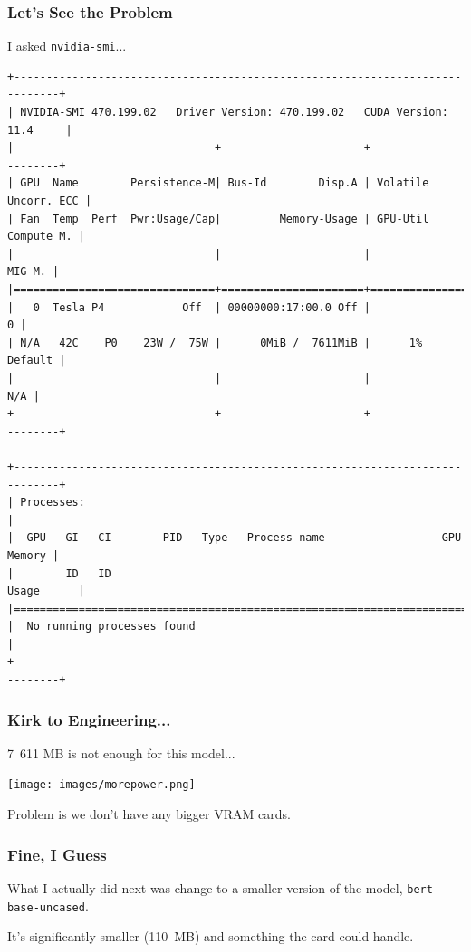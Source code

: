 \begin{frame}[fragile]
\frametitle{Let's See the Problem}
I asked \texttt{nvidia-smi}...

{\scriptsize
\begin{verbatim}
+-----------------------------------------------------------------------------+
| NVIDIA-SMI 470.199.02   Driver Version: 470.199.02   CUDA Version: 11.4     |
|-------------------------------+----------------------+----------------------+
| GPU  Name        Persistence-M| Bus-Id        Disp.A | Volatile Uncorr. ECC |
| Fan  Temp  Perf  Pwr:Usage/Cap|         Memory-Usage | GPU-Util  Compute M. |
|                               |                      |               MIG M. |
|===============================+======================+======================|
|   0  Tesla P4            Off  | 00000000:17:00.0 Off |                    0 |
| N/A   42C    P0    23W /  75W |      0MiB /  7611MiB |      1%      Default |
|                               |                      |                  N/A |
+-------------------------------+----------------------+----------------------+
                                                                               
+-----------------------------------------------------------------------------+
| Processes:                                                                  |
|  GPU   GI   CI        PID   Type   Process name                  GPU Memory |
|        ID   ID                                                   Usage      |
|=============================================================================|
|  No running processes found                                                 |
+-----------------------------------------------------------------------------+
\end{verbatim}
}


\end{frame}

\begin{frame}
\frametitle{Kirk to Engineering...}

7~611 MB is not enough for this model...

\begin{center}
	\texttt{[image: images/morepower.png]}
\end{center}

Problem is we don't have any bigger VRAM cards.

\end{frame}

\begin{frame}
\frametitle{Fine, I Guess}

What I actually did next was change to a smaller version of the model, \texttt{bert-base-uncased}.

It's significantly smaller (110~MB) and something the card could handle. 

\end{frame}

